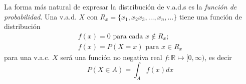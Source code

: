La forma más natural de expresar la distribución de v.a.d.s es la \emph{función de probabilidad}\cite{blitz19}. Una v.a.d. $X$ con $R_x=\{x_1,x_2x_3,\ldots,x_n,\ldots\}$ tiene una función de distribución
\begin{equation}
\begin{matrix}
f(x)=0\text{ para cada }x \notin R_x\text{;}\\
f(x)=P(X=x)\text{ para } x\in R_x
\end{matrix}\label{eq:FP}
\end{equation}
para una v.a.c. $X$ será una función no negativa real $f:\mathbb{R}\mapsto[0,\infty)$, es decir
\begin{equation}
P(X\in A)=\int_{A}f(x)dx
\end{equation}
